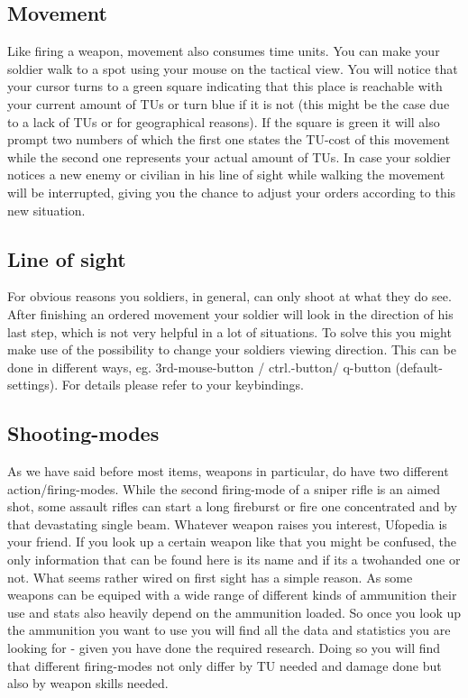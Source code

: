 \subsection{Movement}
Like firing a weapon, movement also consumes time units. You can make your soldier walk to a spot using your mouse on the tactical view. You will notice that your cursor turns to a green square indicating that this place is reachable with your current amount of TUs or turn blue if it is not (this might be the case due to a lack of TUs or for geographical reasons). If the square is green it will also prompt two numbers of which the first one states the TU-cost of this movement while the second one represents your actual amount of TUs. In case your soldier notices a new enemy or civilian in his line of sight while walking the movement will be interrupted, giving you the chance to adjust your orders according to this new situation.

\subsection{Line of sight}
For obvious reasons you soldiers, in general, can only shoot at what they do see. After finishing an ordered movement your soldier will look in the direction of his last step, which is not very helpful in a lot of situations. To solve this you might make use of the possibility to change your soldiers viewing direction. This can be done in different ways, eg. 3rd-mouse-button / ctrl.-button/ q-button (default-settings). For details please refer to your keybindings. 
\subsection{Shooting-modes}
As we have said before most items, weapons in particular, do have two different action/firing-modes. While the second firing-mode of a sniper rifle is an aimed shot, some assault rifles can start a long fireburst or fire one concentrated and by that devastating single beam. Whatever weapon raises you interest, Ufopedia is your friend. If you look up a certain weapon like that you might be confused, the only information that can be found here is its name and if its a twohanded one or not. What seems rather wired on first sight has a simple reason. As some weapons can be equiped with a wide range of different kinds of ammunition their use and stats also heavily depend on the ammunition loaded. So once you look up the ammunition you want to use you will find all the data and statistics you are looking for - given you have done the required research. Doing so you will find that different firing-modes not only differ by TU needed and damage done but also by weapon skills needed.
